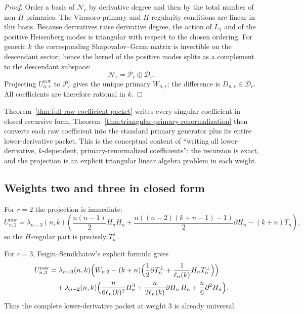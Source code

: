 \begin{proof}
Order a basis of $\mathcal N_r$ by derivative degree and then by the total
number of non-$H$ primaries. The Virasoro-primary and $H$-regularity
conditions are linear in this basis. Because derivatives raise derivative
degree, the action of $L_1$ and of the positive Heisenberg modes is triangular
with respect to the chosen ordering. For generic $k$ the corresponding
Shapovalov--Gram matrix is invertible on the descendant sector, hence the kernel
of the positive modes splits as a complement to the descendant subspace:
\[
\mathcal N_r=\mathcal P_r\oplus\mathcal D_r.
\]
Projecting $U_{n,r}^{\mathrm{raw}}$ to $\mathcal P_r$ gives the unique primary
$W_{n,r}$; the difference is $D_{n,r}\in\mathcal D_r$. All coefficients are
therefore rational in $k$.
\end{proof}

\begin{remark}
Theorem~\ref{thm:full-raw-coefficient-packet} writes every singular coefficient
in closed recursive form. Theorem~\ref{thm:triangular-primary-renormalization}
then converts each raw coefficient into the standard primary generator plus its
entire lower-derivative packet. This is the conceptual content of ``writing
all lower-derivative, $k$-dependent, primary-renormalized coefficients'':
the recursion is exact, and the projection is an explicit triangular linear
algebra problem in each weight.
\end{remark}

\subsection{Weights two and three in closed form}

For $r=2$ the projection is immediate:
\[
U_{n,2}^{\mathrm{raw}}
=
\lambda_{n-3}(n,k)
\left(
\frac{n(n-1)}{2}H_nH_n
+
\frac{n((n-2)(k+n-1)-1)}{2}\partial H_n
-
(k+n)T_n
\right),
\]
so the $H$-regular part is precisely $T_n^\perp$.

For $r=3$, Feigin--Semikhatov's explicit formula gives
\begin{align}
U_{n,3}^{\mathrm{raw}}
&=
\lambda_{n-3}(n,k)
\Bigl(
W_{n,3}
-(k+n)\Bigl(\frac12\partial T_n^\perp+\frac{1}{\ell_n(k)}H_nT_n^\perp\Bigr)
\Bigr)
\notag\\
&\quad
+
\lambda_{n-2}(n,k)
\Bigl(
\frac{n}{6\ell_n(k)^2}H_n^3
+
\frac{n}{2\ell_n(k)}\partial H_n\,H_n
+
\frac{n}{6}\partial^2H_n
\Bigr).
\label{eq:weight-three-renormalized}
\end{align}
Thus the complete lower-derivative packet at weight $3$ is already universal.

